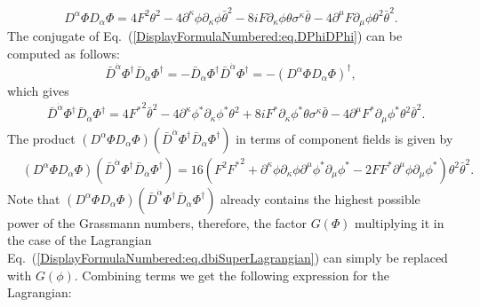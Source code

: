 \documentclass[a4paper,11pt]{article}
\begin{document}
	\begin{equation}\label{DisplayFormulaNumbered:eq.DPhiDPhi}
		D^\alpha \Phi D_\alpha \Phi =4 F^2\theta^2-4\partial^\kappa \phi \partial_\kappa \phi {\bar{\theta}}^2-8i F\partial_\kappa \phi \theta \sigma^\kappa \bar{\theta}-4 \partial^\mu F\partial_\mu \phi \theta^2 {\bar{\theta}}^2.
	\end{equation}
	The conjugate of Eq.~(\ref{DisplayFormulaNumbered:eq.DPhiDPhi}) can be computed as follows:
	\begin{equation}
		{\bar{D}}^{\dot{\alpha}}\Phi^\dagger {\bar{D}}_{\dot{\alpha}}\Phi^\dagger =- {\bar{D}}_{\dot{\alpha}}\Phi^\dagger {\bar{D}}^{\dot{\alpha}}\Phi^\dagger =-{\left(D^\alpha \Phi D_\alpha \Phi \right)}^\dagger,
	\end{equation}
	which gives
	\begin{equation}\label{DisplayFormulaNumbered:eq.DBPhiDgDBPhiDg}
	\begin{split}
		& {\bar{D}}^{\dot{\alpha}}\Phi^\dagger {\bar{D}}_{\dot{\alpha}}\Phi^\dagger
		=4{F^*}^2{\bar{\theta}}^2-4\partial^\kappa \phi^*\partial_\kappa \phi^* \theta^2+8i F^* \partial_\kappa \phi^* \theta \sigma^\kappa \bar{\theta}-4 \partial^\mu F^* \partial_\mu \phi^* \theta^2 {\bar{\theta}}^2.
	\end{split}
	\end{equation}
	The product $\left(D^\alpha \Phi D_\alpha \Phi \right)\left({\bar{D}}^{\dot{\alpha}}\Phi^\dagger {\bar{D}}_{\dot{\alpha}}\Phi^\dagger \right)$ in terms of component fields
	is given by
	\begin{equation}\label{DisplayFormulaNumbered:eq.DPhiDPhiDBPhiDgDBPhiDg}
	\begin{split}
		& \left(D^\alpha \Phi D_\alpha \Phi \right)\left({\bar{D}}^{\dot{\alpha}}\Phi^\dagger {\bar{D}}_{\dot{\alpha}}\Phi^\dagger \right)
		=16\left( F^2{F^*}^2+\partial^\kappa \phi \partial_\kappa \phi \partial^\mu \phi^*\partial_\mu \phi^*-2F F^*\partial^\mu \phi \partial_\mu \phi^*\right)\theta^2{\bar{\theta}}^2.
	\end{split}
	\end{equation}
	Note that $\left(D^\alpha \Phi D_\alpha \Phi \right)\left({\bar{D}}^{\dot{\alpha}}\Phi^\dagger {\bar{D}}_{\dot{\alpha}}\Phi^\dagger \right)$ already contains the highest possible power of the Grassmann numbers, therefore, the factor $G\left(\Phi \right)$ multiplying it in the case of the Lagrangian Eq.~(\ref{DisplayFormulaNumbered:eq.dbiSuperLagrangian}) can simply be replaced with $G\left(\phi \right)$.
	Combining terms we get the following expression for the Lagrangian:
\end{document}
